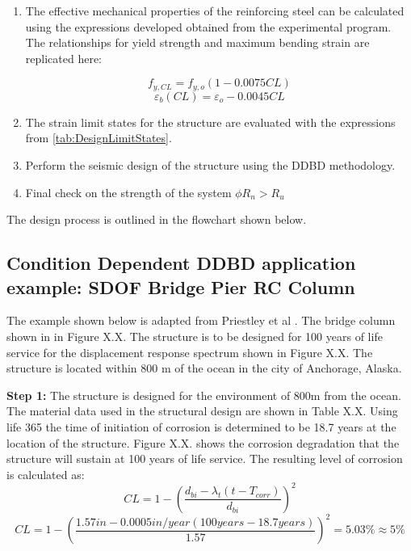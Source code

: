 \begin{enumerate}
    \item The effective mechanical properties of the reinforcing steel can be calculated using the expressions developed obtained from the experimental program. The relationships for yield strength and maximum bending strain are replicated here:
    
    \begin{equation}
        f_{y,CL} = f_{y,o}(1-0.0075CL)
        \label{eq.Calderon_Fy_vs_CL_06}
    \end{equation}
    \begin{equation}
        \varepsilon_{b}(CL) = \varepsilon_{o}-0.0045CL
        \label{eq.Calderon_eb_vs_CL_06}
    \end{equation}
    \item The strain limit states for the structure are evaluated with the expressions from \ref{tab:DesignLimitStates}.
    \item Perform the seismic design of the structure using the DDBD methodology.
    \item Final check on the strength of the system $\phi R_{n}>R_{u}$
\end{enumerate}

The design process is outlined in the flowchart shown below. 

\subsection{Condition Dependent DDBD application example: SDOF Bridge Pier RC Column}

The example shown below is adapted from Priestley et al \cites{Priestley2007}. The bridge column shown in in Figure X.X. The structure is to be designed for 100 years of life service for the displacement response spectrum shown in Figure X.X. The structure is located within 800 m of the ocean in the city of Anchorage, Alaska.

\textbf{Step 1:} The structure is designed for the environment of 800m from the ocean. The material data used in the structural design are shown in Table X.X. Using life 365 the time of initiation of corrosion is determined to be 18.7 years at the location of the structure. Figure X.X. shows the corrosion degradation that the structure will sustain at 100 years of life service. The resulting level of corrosion is calculated as:
\begin{displaymath}
    CL=1-\left(\frac{d_{bi}-\lambda_{t}(t-T_{corr})}{d_{bi}}\right)^2
\end{displaymath}
\begin{displaymath}
    CL= 1-\left(\frac{1.57 in -0.0005 in/year (100 years -18.7 years)}{1.57}\right)^2=5.03\% \approx 5\%
\end{displaymath}

